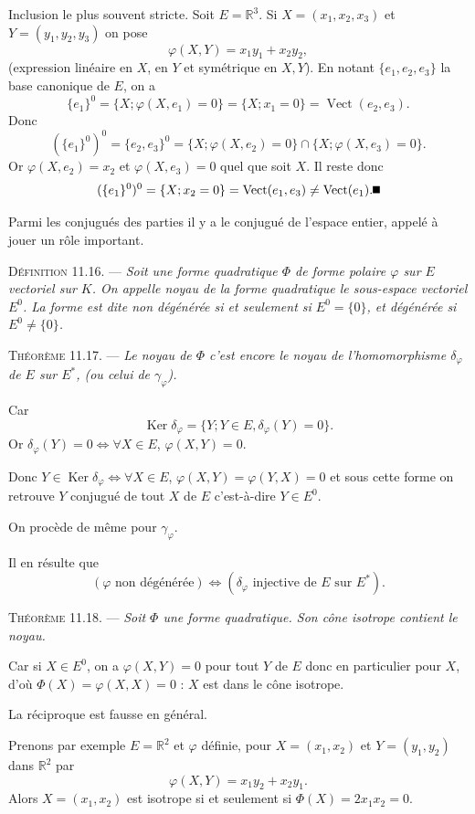 Inclusion le plus souvent stricte. Soit $E=\mathbb R^3$. Si $X=(x_1,x_2,x_3)$ et $Y=(y_1,y_2,y_3)$ on pose
\[
\varphi(X,Y)=x_1y_1+x_2y_2,
\]
(expression linéaire en $X$, en $Y$ et symétrique en $X,Y$). En notant $\{e_1,e_2,e_3\}$ la base canonique de $E$, on a
\[
\{e_1\}^0=\{X;\varphi(X,e_1)=0\}=\{X;x_1=0\}=\operatorname{Vect}(e_2,e_3).
\]
Donc
\[
(\{e_1\}^0)^0=\{e_2,e_3\}^0=\{X;\varphi(X,e_2)=0\}\cap\{X;\varphi(X,e_3)=0\}.
\]
Or $\varphi(X,e_2)=x_2$ et $\varphi(X,e_3)=0$ quel que soit $X$. Il reste donc
\[
(\{e_1\}^0)^0=\{X;x_2=0\}=\operatorname{Vect}(e_1,e_3)\ne\operatorname{Vect}(e_1). \bookend
\]

Parmi les conjugués des parties il y a le conjugué de l'espace entier, appelé à jouer un rôle important.

\medskip\noindent\textsc{Définition 11.16.} --- \emph{Soit une forme quadratique $\Phi$ de forme polaire $\varphi$ sur $E$ vectoriel sur $K$. On appelle noyau de la forme quadratique le sous-espace vectoriel $E^0$. La forme est dite non dégénérée si et seulement si $E^0=\{0\}$, et dégénérée si $E^0\ne\{0\}$.}

\medskip\noindent\textsc{Théorème 11.17.} --- \emph{Le noyau de $\Phi$ c'est encore le noyau de l'homomorphisme $\delta_\varphi$ de $E$ sur $E^*$, (ou celui de $\gamma_\varphi$).}

Car
\[
\operatorname{Ker}\delta_\varphi=\{Y;Y\in E,\delta_\varphi(Y)=0\}.
\]
Or $\delta_\varphi(Y)=0\Longleftrightarrow\forall X\in E$, $\varphi(X,Y)=0$.

Donc $Y\in\operatorname{Ker}\delta_\varphi\Longleftrightarrow\forall X\in E$, $\varphi(X,Y)=\varphi(Y,X)=0$ et sous cette forme on retrouve $Y$ conjugué de tout $X$ de $E$ c'est-à-dire $Y\in E^0$.

On procède de même pour $\gamma_\varphi$. \bookend

Il en résulte que
\[
(\varphi\text{ non dégénérée})\Longleftrightarrow(\delta_\varphi\text{ injective de }E\text{ sur }E^*).
\]

\medskip\noindent\textsc{Théorème 11.18.} --- \emph{Soit $\Phi$ une forme quadratique. Son cône isotrope contient le noyau.}

Car si $X\in E^0$, on a $\varphi(X,Y)=0$ pour tout $Y$ de $E$ donc en particulier pour $X$, d'où $\Phi(X)=\varphi(X,X)=0$ : $X$ est dans le cône isotrope. \bookend

La réciproque est fausse en général.

Prenons par exemple $E=\mathbb R^2$ et $\varphi$ définie, pour $X=(x_1,x_2)$ et $Y=(y_1,y_2)$ dans $\mathbb R^2$ par
\[
\varphi(X,Y)=x_1y_2+x_2y_1.
\]
Alors $X=(x_1,x_2)$ est isotrope si et seulement si $\Phi(X)=2x_1x_2=0$.

